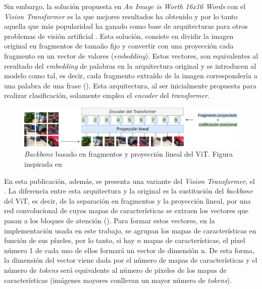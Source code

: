 Sin embargo, la solución propuesta en \textit{An Image is Worth 16x16 Words} con el \textit{Vision Transformer} \cite{image16x16words} es la que mejores resultados ha obtenido y por lo tanto aquella que más popularidad ha ganado como base de arquitecturas para otros problemas de visión artificial \cite{visiontransformersDPT, bhat2020adabins, chen2021transunet, liu2021Swin}. Esta solución, consiste en dividir la imagen original en fragmentos de tamaño fijo y convertir con una proyección cada fragmento en un vector de valores (\textit{embedding}). Estos vectores, son equivalentes al resultado del \textit{embedding} de palabras en la arquitectura original y se introducen al modelo como tal, es decir, cada fragmento extraído de la imagen correspondería a una palabra de una frase (). Esta arquitectura, al ser inicialmente propuesta para realizar clasificación, solamente emplea el \textit{encoder} del \textit{transformer}.

\begin{figure}[H]
\centering
\includegraphics[width=1\linewidth]{imagenes/vit.png} 
\captionsetup{width=.8\linewidth}
\caption{\textit{Backbone} basado en fragmentos y proyección lineal del ViT. Figura inspirada en \cite{image16x16words}}
\label{fig:vit}
\end{figure}

En esta publicación, además, se presenta una variante del \textit{Vision Transformer}, el . La diferencia entre esta arquitectura y la original es la sustitución del \textit{backbone} del ViT, es decir, de la separación en fragmentos y la proyección lineal, por una red convolucional de cuyos mapas de características se extraen los vectores que pasan a los bloques de atención (). Para formar estos vectores, en la implementación usada en este trabajo, se agrupan los mapas de características en función de sus píxeles, por lo tanto, si hay $n$ mapas de características, el píxel número 1 de cada uno de ellos formará un vector de dimensión n. De esta forma, la dimensión del vector viene dada por el número de mapas de características y el número de \textit{tokens} será equivalente al número de píxeles de los mapas de características (imágenes mayores conllevan un mayor número de \textit{tokens}).

